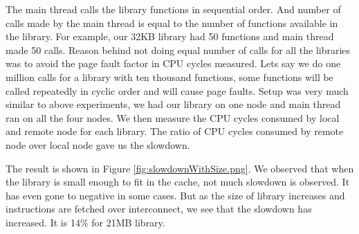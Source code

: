 The main thread calls the library functions in sequential order.
And number of calls made by the main thread is equal to the number of functions available in the library.
For example, our 32KB library had 50 functions and main thread made 50 calls.
Reason behind not doing equal number of calls for all the libraries was to avoid the page fault factor in CPU cycles measured.
Lets say we do one million calls for a library with ten thousand functions, some functions will be called repeatedly in cyclic order and will cause page faults.
Setup was very much similar to above experiments, we had our library on one node and main thread ran on all the four nodes.
We then measure the CPU cycles consumed by local and remote node for each library.
The ratio of CPU cycles consumed by remote node over local node gave us the slowdown.

The result is shown in Figure \ref{fig:slowdownWithSize.png}.
We observed that when the library is small enough to fit in the cache, not much slowdown is observed.
It has even gone to negative in some cases.
But as the size of library increases and instructions are fetched over interconnect, we see that the slowdown has increased.
It is 14\% for 21MB library.
